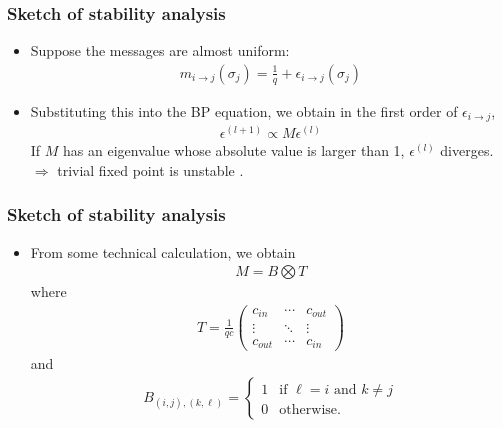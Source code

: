 \documentclass[dvipdfmx,11pt]{beamer}
\begin{document}
\begin{frame}
  \frametitle{Sketch of stability analysis}
  \begin{itemize}
    \item Suppose the messages are almost uniform:
    \begin{align*}
      m_{i \to j}(\sigma_j) = \frac{1}{q} + \epsilon_{i \to j}(\sigma_j)
    \end{align*}
    \item Substituting this into the BP equation, we obtain in the first order of $\epsilon_{i \to j}$,
    \begin{align*}
      \epsilon^{(l+1)} \propto M \epsilon^{(l)}
    \end{align*}
    If $M$ has an eigenvalue whose absolute value is larger than 1, $\epsilon^{(l)}$ diverges. \\
    $\Rightarrow$ trivial fixed point is unstable \Smiley.
  \end{itemize}
\end{frame}

\begin{frame}
  \frametitle{Sketch of stability analysis}
  \begin{itemize}
    \frametitle{Sketch of stability analysis}
    \item From some technical calculation, we obtain
    \begin{align*}
      M = B \bigotimes T
    \end{align*}
    where 
    \begin{align*}
      T = \frac{1}{qc}
        \begin{pmatrix}
        c_{in} & \cdots & c_{out} \\
        \vdots & \ddots & \vdots \\
        c_{out} & \cdots & c_{in}
        \end{pmatrix}
    \end{align*}
    and 
    \begin{align*}
      B_{(i,j),(k,\ell)} = 
        \begin{cases} 
        1 & \text{if } \ell = i \text{ and } k \neq j \\
        0 & \text{otherwise}.
        \end{cases}
    \end{align*}
  \end{itemize}
  

\end{frame}
\end{document}
